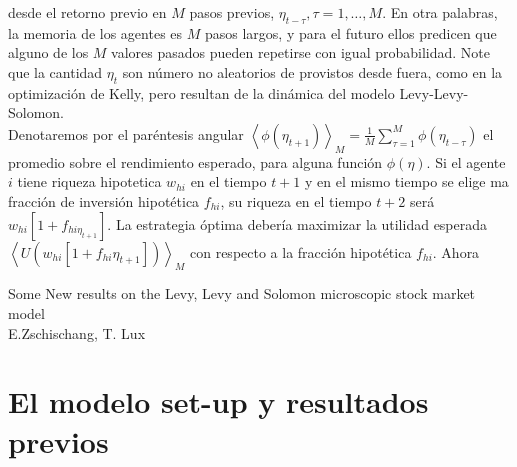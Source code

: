 \documentclass[12pt,a4paper]{article}
\begin{document}
desde el retorno previo  en $M$ pasos previos, $\eta_{t-\tau},\tau=1,\dots,M$. En otra palabras, la memoria de los agentes es $M$ pasos largos, y para el futuro ellos predicen que alguno de los $M$ valores pasados pueden repetirse con igual probabilidad. Note que la cantidad $\eta_t$ son número no aleatorios de provistos desde fuera, como en la optimización de Kelly, pero resultan de la dinámica del modelo Levy-Levy-Solomon.\\
\quad Denotaremos por el paréntesis angular $\left< \phi(\eta_{t+1})\right>_M=\frac{1}{M}\sum^M_{\tau=1}\phi(\eta_{t-\tau})$ el promedio sobre el rendimiento esperado, para alguna función $\phi(\eta)$. Si el agente $i$ tiene riqueza hipotetica $w_{hi}$ en el tiempo $t+1$ y en el mismo tiempo se elige ma fracción de inversión hipotética $f_{hi}$, su riqueza en el tiempo $t+2$ será $w_{hi}\left[1+f_{hi\eta_{t+1}}\right]$. La estrategia óptima debería maximizar la utilidad esperada $\left<U\left(w_{hi}\left[1+f_{hi}\eta_{t+1}\right]\right)\right>_M$ con respecto a la fracción hipotética $f_{hi}$. Ahora 
\newpage

\begin{center}
Some New results on the Levy, Levy and Solomon microscopic stock market model\\
E.Zschischang, T. Lux\citep{Zschischang2001}
\end{center}
\section*{El modelo set-up y resultados previos}
\end{document}
